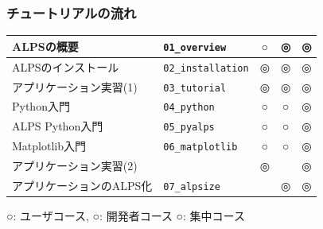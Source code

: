 \begin{frame}
  \frametitle{チュートリアルの流れ}
  \begin{tabular}{|l|l|c|c|c|}
        \hline
        ALPSの概要 & {\tt 01\_overview} & {\footnotesize\color{red} ○} & {\footnotesize\color{blue} ◎} & {\footnotesize\color{green} ◎} \\
        \hline
        ALPSのインストール & {\tt 02\_installation} & {\footnotesize\color{red} ◎} & {\footnotesize\color{blue} ◎} & {\footnotesize\color{green} ◎} \\
        \hline
        アプリケーション実習(1) & {\tt 03\_tutorial} & {\footnotesize\color{red} ◎} & {\footnotesize\color{blue} ◎} & {\footnotesize\color{green} ◎} \\
        \hline
        Python入門 & {\tt 04\_python} & {\footnotesize\color{red} ○} & {\footnotesize\color{blue} ○} & {\footnotesize\color{green} ◎} \\
        \hline
        ALPS Python入門 & {\tt 05\_pyalps} & {\footnotesize\color{red} ○} & {\footnotesize\color{blue} ○} & {\footnotesize\color{green} ◎} \\
        \hline
        Matplotlib入門 & {\tt 06\_matplotlib} & {\footnotesize\color{red} ○} & {\footnotesize\color{blue} ○} & {\footnotesize\color{green} ◎} \\
        \hline
        アプリケーション実習(2) & & {\footnotesize\color{red} ◎} & {\footnotesize\color{blue} } & {\footnotesize\color{green} ◎} \\
        \hline
        アプリケーションのALPS化 & {\tt 07\_alpsize} & {\footnotesize\color{red} } & {\footnotesize\color{blue} ◎} & {\footnotesize\color{green} ◎} \\
        \hline
  \end{tabular}
  
  {\footnotesize\color{red} ○}: ユーザコース, {\footnotesize\color{blue} ○}: 開発者コース {\footnotesize\color{green} ○}: 集中コース
\end{frame}

